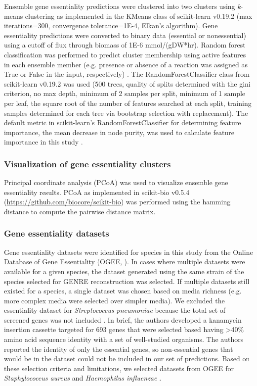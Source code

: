 \documentclass[11pt,twocolumn,notitlepage,openany,twoside]{book}
\begin{document}
\begin{refsection}
Ensemble gene essentiality predictions were clustered into two clusters using \textit{k}-means clustering as implemented in the KMeans class of scikit-learn v0.19.2 \cite{Pedregosa2011-wa} (max iterations=300, convergence tolerance=1E-4, Elkan’s \cite{Elkan2003-du} algorithm). Gene essentiality predictions were converted to binary data (essential or nonessential) using a cutoff of flux through biomass of 1E-6 mmol/(gDW*hr). Random forest classification was performed to predict cluster membership using active features in each ensemble member (e.g. presence or absence of a reaction was assigned as True or False in the input, respectively) \cite{Breiman2001-pl}. The RandomForestClassifier class from scikit-learn v0.19.2 was used (500 trees, quality of splits determined with the gini criterion, no max depth, minimum of 2 samples per split, minimum of 1 sample per leaf, the square root of the number of features searched at each split, training samples determined for each tree via bootstrap selection with replacement). The default metric in scikit-learn’s RandomForestClassifier for determining feature importance, the mean decrease in node purity, was used to calculate feature importance in this study \cite{Gordon1984-iw}.

\subsubsection{Visualization of gene essentiality clusters}

Principal coordinate analysis (PCoA) \cite{Gower1966-xt} was used to visualize ensemble gene essentiality results. PCoA as implemented in scikit-bio v0.5.4 (\url{https://github.com/biocore/scikit-bio}) was performed using the hamming distance \cite{Hamming1950-zv} to compute the pairwise distance matrix.

\subsubsection{Gene essentiality datasets}

Gene essentiality datasets were identified for species in this study from the Online Database of Gene Essentiality (OGEE, \cite{Chen2017-cs}). In cases where multiple datasets were available for a given species, the dataset generated using the same strain of the species selected for GENRE reconstruction was selected. If multiple datasets still existed for a species, a single dataset was chosen based on media richness (e.g. more complex media were selected over simpler media). We excluded the essentiality dataset for \textit{Streptococcus pneumoniae} because the total set of screened genes was not included \cite{Song2005-uc}. In brief, the authors developed a kanamycin insertion cassette targeted for 693 genes that were selected based having >40\% amino acid sequence identity with a set of well-studied organisms. The authors reported the identity of only the essential genes, so non-essential genes that would be in the dataset could not be included in our set of predictions. Based on these selection criteria and limitations, we selected datasets from OGEE for \textit{Staphylococcus aureus} \cite{Chaudhuri2009-za} and \textit{Haemophilus influenzae} \cite{Akerley2002-ja}.


\end{refsection}
\end{document}
